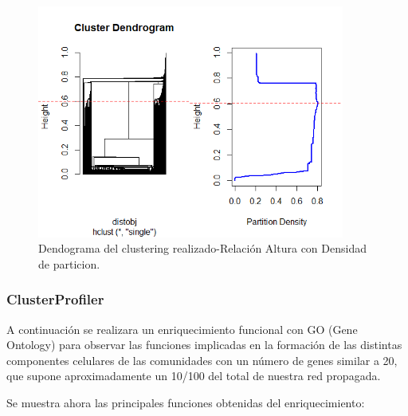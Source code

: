 \begin{figure}[h]
	\centering
	\includegraphics[width=0.90\textwidth]{figures/Grapichs_LinkComm.png}
	\caption{Dendograma del clustering realizado-Relación Altura con Densidad de particion. }
	\label{fig:LinkComm1}
\end{figure}

\hfill

\subsubsection{ClusterProfiler}

A continuación se realizara un enriquecimiento funcional con GO (Gene Ontology) para observar las funciones implicadas en la formación de las distintas componentes celulares de las comunidades con un número de genes similar a 20, que supone aproximadamente un 10/100 del total de nuestra red propagada.

\hfill

Se muestra ahora las principales funciones obtenidas del enriquecimiento:


